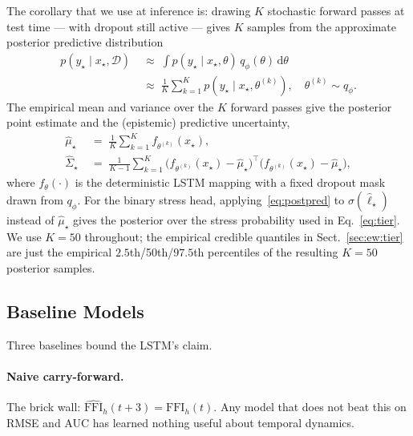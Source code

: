 \documentclass[colorlinks,balance]{asmeconf}
\begin{document}
The corollary that we use at inference is: drawing $K$ stochastic forward passes at test time --- with dropout still active --- gives $K$ samples from the approximate posterior predictive distribution
\begin{equation}\label{eq:postpred}
\begin{aligned}
p(y_\star \mid x_\star, \mathcal{D}) \;&\approx\; \int p(y_\star \mid x_\star, \theta)\, q_\phi(\theta)\, \mathrm{d}\theta \\
&\approx\; \frac{1}{K}\sum_{k=1}^K p(y_\star \mid x_\star, \theta^{(k)}),\quad \theta^{(k)} \sim q_\phi.
\end{aligned}
\end{equation}
The empirical mean and variance over the $K$ forward passes give the posterior point estimate and the (epistemic) predictive uncertainty,
\begin{align}
\hat\mu_\star \;&=\; \frac{1}{K}\sum_{k=1}^K f_{\theta^{(k)}}(x_\star), \label{eq:postmean}\\
\hat\Sigma_\star \;&=\; \frac{1}{K-1}\sum_{k=1}^K \big(f_{\theta^{(k)}}(x_\star) - \hat\mu_\star\big)^{\!\top}\!\big(f_{\theta^{(k)}}(x_\star) - \hat\mu_\star\big), \label{eq:postcov}
\end{align}
where $f_\theta(\cdot)$ is the deterministic LSTM mapping with a fixed dropout mask drawn from $q_\phi$. For the binary stress head, applying~\eqref{eq:postpred} to $\sigma(\hat\ell_\star)$ instead of $\hat\mu_\star$ gives the posterior over the stress probability used in Eq.~\eqref{eq:tier}. We use $K \!=\! 50$ throughout; the empirical credible quantiles in Sect.~\ref{sec:ew:tier} are just the empirical $2.5$th/50th/$97.5$th percentiles of the resulting $K \!=\! 50$ posterior samples.

\subsection{Baseline Models}\label{sec:ew:bsl}
Three baselines bound the LSTM's claim.

\paragraph{Naive carry-forward.} The brick wall: $\hat{\mathrm{FFI}}_h(t\!+\!3) = \mathrm{FFI}_h(t)$. Any model that does not beat this on RMSE and AUC has learned nothing useful about temporal dynamics.
\end{document}
